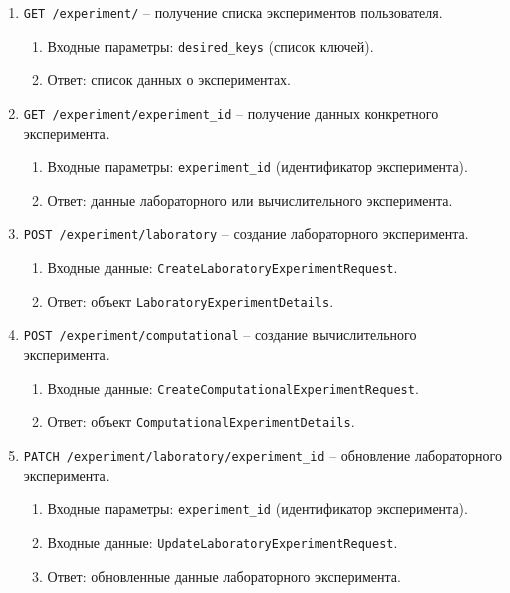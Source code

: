 \begin{enumerate}
    \item \texttt{GET /experiment/} -- получение списка экспериментов пользователя.
    \begin{enumerate}[label=\arabic{enumi}.\arabic*.]
        \item Входные параметры: \texttt{desired\_keys} (список ключей).
        \item Ответ: список данных о экспериментах.
    \end{enumerate}

    \item \texttt{GET /experiment/{experiment\_id}} -- получение данных конкретного эксперимента.
    \begin{enumerate}[label=\arabic{enumi}.\arabic*.]
        \item Входные параметры: \texttt{experiment\_id} (идентификатор эксперимента).
        \item Ответ: данные лабораторного или вычислительного эксперимента.
    \end{enumerate}

    \item \texttt{POST /experiment/laboratory} -- создание лабораторного эксперимента.
    \begin{enumerate}[label=\arabic{enumi}.\arabic*.]
        \item Входные данные: \texttt{CreateLaboratoryExperimentRequest}.
        \item Ответ: объект \texttt{LaboratoryExperimentDetails}.
    \end{enumerate}

    \item \texttt{POST /experiment/computational} -- создание вычислительного эксперимента.
    \begin{enumerate}[label=\arabic{enumi}.\arabic*.]
        \item Входные данные: \texttt{CreateComputationalExperimentRequest}.
        \item Ответ: объект \texttt{ComputationalExperimentDetails}.
    \end{enumerate}

    \item \texttt{PATCH /experiment/laboratory/{experiment\_id}} -- обновление лабораторного эксперимента.
    \begin{enumerate}[label=\arabic{enumi}.\arabic*.]
        \item Входные параметры: \texttt{experiment\_id} (идентификатор эксперимента).
        \item Входные данные: \texttt{UpdateLaboratoryExperimentRequest}.
        \item Ответ: обновленные данные лабораторного эксперимента.
    \end{enumerate}


\end{enumerate}
